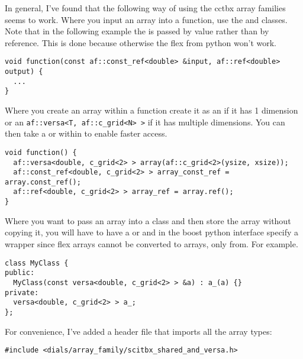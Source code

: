 \documentclass[a4paper,10pt]{article}
\begin{document}
In general, I've found that the following way of using the cctbx array families
seems to work. Where you input an array into a function, use the 
\afconstref and \afref classes. Note that in the following 
example the \afref is passed by value rather than by reference. This
is done because otherwise the flex from python won't work. 

\begin{lstlisting}
void function(const af::const_ref<double> &input, af::ref<double> output) {
  ...
}
\end{lstlisting}

Where you create an array within a function create it as an
\afshared if it has 1 dimension or an \texttt{af::versa<T, af::c\_grid<N> >}
if it has multiple dimensions. You can then take a \afconstref or
\afref within to enable faster access.

\begin{lstlisting}
void function() {
  af::versa<double, c_grid<2> > array(af::c_grid<2>(ysize, xsize));
  af::const_ref<double, c_grid<2> > array_const_ref = array.const_ref();
  af::ref<double, c_grid<2> > array_ref = array.ref();
}
\end{lstlisting}

Where you want to pass an array into a class and then store the array without
copying it, you will have to have a \afversa or \afshared and
in the boost python interface specify a wrapper since flex arrays cannot be
converted to \afversa arrays, only from. For example.

\begin{lstlisting}
class MyClass {
public:
  MyClass(const versa<double, c_grid<2> > &a) : a_(a) {}
private:
  versa<double, c_grid<2> > a_;
};
\end{lstlisting}

For convenience, I've added a header file that imports all the array types:

\begin{lstlisting}
#include <dials/array_family/scitbx_shared_and_versa.h>
\end{lstlisting}
\end{document}
